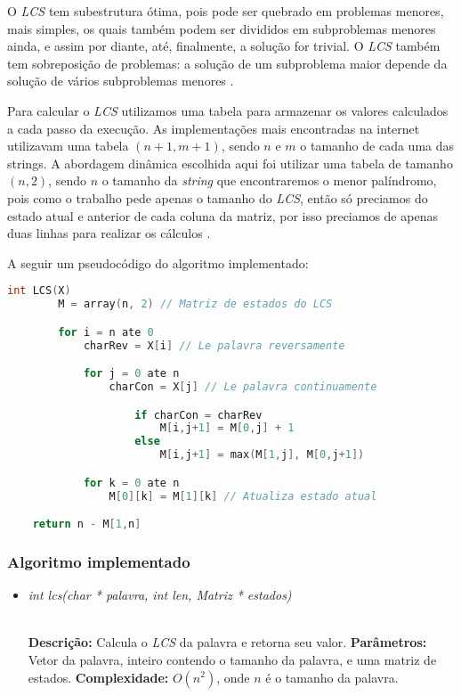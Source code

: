 \documentclass[12pt]{article}
\begin{document}
    O \textit{LCS} tem subestrutura ótima, pois pode ser quebrado em problemas menores, mais simples, os quais também podem ser divididos em subproblemas menores ainda, e assim por diante, até, finalmente, a solução for trivial. O \textit{LCS} também tem sobreposição de problemas: a solução de um subproblema maior depende da solução de vários subproblemas menores \cite{wikilcs}.

    Para calcular o \textit{LCS} utilizamos uma tabela para armazenar os valores calculados a cada passo da execução. As implementações mais encontradas na internet utilizavam uma tabela $(n+1, m+1)$, sendo $n$ e $m$ o tamanho de cada uma das strings. A abordagem dinâmica escolhida aqui foi utilizar uma tabela de tamanho $(n, 2)$, sendo $n$ o tamanho da \textit{string} que encontraremos o menor palíndromo, pois como o trabalho pede apenas o tamanho do \textit{LCS}, então só preciamos do estado atual e anterior de cada coluna da matriz, por isso preciamos de apenas duas linhas para realizar os cálculos \cite{hirsch}.

    A seguir um pseudocódigo do algoritmo implementado:

    \newpage

    \begin{lstlisting}[language=c]
    int LCS(X)
        M = array(n, 2) // Matriz de estados do LCS

        for i = n ate 0
            charRev = X[i] // Le palavra reversamente

            for j = 0 ate n
                charCon = X[j] // Le palavra continuamente

                    if charCon = charRev
                        M[i,j+1] = M[0,j] + 1
                    else
                        M[i,j+1] = max(M[1,j], M[0,j+1])

            for k = 0 ate n
                M[0][k] = M[1][k] // Atualiza estado atual

    return n - M[1,n]
    \end{lstlisting}


\subsubsection{Algoritmo implementado}

\begin{itemize}
 \item \begin{large}\textit{int lcs(char * palavra, int len, Matriz * estados)}\end{large}\\
 \subitem \textbf{Descrição:} Calcula o \textit{LCS} da palavra e retorna seu valor.
 \subitem \textbf{Parâmetros:} Vetor da palavra, inteiro contendo o tamanho da palavra, e uma matriz de estados.
 \subitem \textbf{Complexidade:} $O(n^2)$, onde $n$ é o tamanho da palavra.
\end{itemize}
\end{document}
